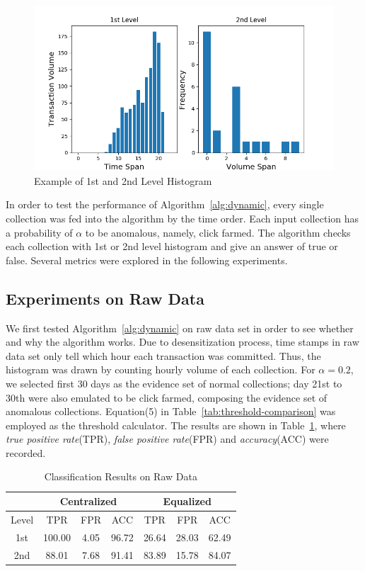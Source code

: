 \documentclass[10pt,conference,letterpaper]{IEEEtran}
\begin{document}
			\begin{figure}[!t]
				\centering
				\includegraphics[width=\linewidth]{fig/HistogramExample.png}
				\caption{Example of 1st and 2nd Level Histogram}
				\label{fig:histogram-example}
			\end{figure}
	
			In order to test the performance of Algorithm~\ref{alg:dynamic}, every single collection was fed into the algorithm by the time order. Each input collection has a probability of $\alpha$ to be anomalous, namely, click farmed. The algorithm checks each collection with 1st or 2nd level histogram and give an answer of true or false. Several metrics were explored in the following experiments.
			
		\subsection{Experiments on Raw Data}\label{sec:exp-raw}
			We first tested Algorithm~\ref{alg:dynamic} on raw data set in order to see whether and why the algorithm works. Due to desensitization process, time stamps in raw data set only tell which hour each transaction was committed. Thus, the histogram was drawn by counting hourly volume of each collection. For $\alpha = 0.2$, we selected first 30 days as the evidence set of normal collections; day 21st to 30th were also emulated to be click farmed, composing the evidence set of anomalous collections. Equation(5) in Table~\ref{tab:threshold-comparison} was employed as the threshold calculator. The results are shown in Table~\ref{tab:result-raw-1st}, where \textit{true positive rate}(TPR), \textit{false positive rate}(FPR) and \textit{accuracy}(ACC) were recorded.
	
			\begin{table}[!ht]
				\centering
				\caption{Classification Results on Raw Data}
				\label{tab:result-raw-1st}
				\begin{tabular}{|c|c|c|c|c|c|c|}
					\hline
					& \multicolumn{3}{c|}{Centralized} & \multicolumn{3}{c|}{Equalized}\\
					\hline
					Level & TPR & FPR & ACC & TPR & FPR & ACC\\
					\hline
					1st & 100.00 & 4.05 & 96.72 & 26.64 & 28.03 & 62.49\\
					\hline
					2nd & 88.01 & 7.68 & 91.41 & 83.89 & 15.78 & 84.07\\
					\hline
				\end{tabular}
			\end{table}
			
\end{document}
